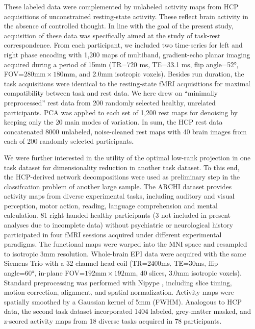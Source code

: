 \documentclass{article} %
\begin{document}
These labeled data were complemented by unlabeled activity maps
from HCP acquisitions of unconstrained resting-state activity.
These reflect brain activity in the absence of controlled thought.
In line with the goal of the present study, acquisition of these data was
specifically aimed at the study of task-rest correspondence.
From each participant, we included two
time-series for left and right phase encoding
with 1,200 maps of multiband, gradient-echo planar imaging acquired
during a period of 15min (TR=720 ms, TE=33.1 ms, flip angle=52°,
FOV=$280\textrm{mm}\times180\textrm{mm}$, and 2.0mm isotropic voxels). 
Besides run duration,
the task acquisitions were identical to the resting-state fMRI acquisitions
for maximal compatibility between task and rest data.
We here drew on ``minimally preprocessed'' rest data
from 200 randomly selected healthy, unrelated participants.
PCA was applied to each set of 1,200 rest maps for
denoising by keeping only the 20 main modes of
variation.
In sum, the HCP rest data concatenated
8000 unlabeled, noise-cleaned rest maps with
40 brain images from each of 200 randomly selected participants.

We were further interested in the utility of the optimal low-rank projection
in one task dataset for dimensionality reduction in another task dataset.
To this end, the HCP-derived network decompositions were used as preliminary
step in the classifcation problem of another large sample.
The ARCHI dataset \cite{pinel07} provides activity maps from
diverse experimental tasks, including auditory and visual perception, motor action,
reading, language comprehension and mental calculation.
81 right-handed healthy participants
(3 not included in present analyses due to incomplete data)
without psychiatric or
neurological history participated in four fMRI sessions acquired under
different experimental paradigms.
The functional maps were warped into
the MNI space and resampled to isotropic 3mm resolution.
Whole-brain EPI data were acquired with the same Siemens Trio with a 32
channel head coil (TR=2400ms, TE=30ms, flip angle=60°, in-plane
FOV=$192\textrm{mm}\times192\textrm{mm}$, 40 slices, 3.0mm isotropic voxels).
Standard preprocessing was performed with Nipype \cite{gorgo11}, including
slice timing, motion correction, alignment, and spatial normalization.
Activity maps were spatially smoothed by
a Gaussian kernel of 5mm (FWHM).
Analogous to HCP data, the second task dataset incorporated 1404
labeled, grey-matter masked, and z-scored activity maps
from 18 diverse tasks acquired in 78 participants.
\end{document}
